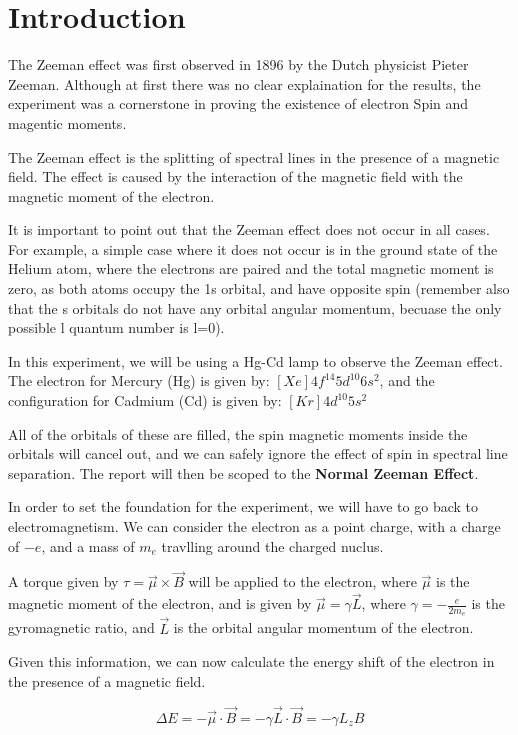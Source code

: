 \section{Introduction}

The Zeeman effect was first observed in 1896 by the Dutch physicist Pieter Zeeman. Although at first there was no clear explaination
for the results, the experiment was a cornerstone in proving the existence of electron Spin and magentic moments.

The Zeeman effect is the splitting of spectral lines in the presence of a magnetic field. The effect is caused by the
interaction of the magnetic field with the magnetic moment of the electron.

It is important to point out that the Zeeman effect does not occur in all cases. For example, a simple case where it does not occur
is in the ground state of the Helium atom, where the electrons are paired and the total magnetic moment is zero, as both atoms occupy the 1s orbital,
and have opposite spin (remember also that the s orbitals do not have any orbital angular momentum, becuase the only possible l
quantum number is l=0).

In this experiment, we will be using a Hg-Cd lamp to observe the Zeeman effect. The electron for Mercury (Hg) is given by: $[Xe] 4f^{14} 5d^{10} 6s^2$, and the
configuration for Cadmium (Cd) is given by: $[Kr] 4d^{10} 5s^2$

All of the orbitals of these are filled, the spin magnetic moments inside the orbitals will cancel out,
and we can safely ignore the effect of spin in spectral line separation. The report will then be scoped to the
\textbf{Normal Zeeman Effect}.

In order to set the foundation for the experiment, we will have to go back to electromagnetism.
We can consider the electron as a point charge, with a charge of $-e$, and a mass of $m_e$ travlling around the
charged nuclus.

A torque given by $\tau = \vec{\mu} \times \vec{B}$ will be applied to the electron, where $\vec{\mu}$ is the
magnetic moment of the electron,
and is given by $\vec{\mu} = \gamma \vec{L}$, where $\gamma = - \frac{e}{2 m_e}$ is the gyromagnetic ratio,
and $\vec{L}$ is the orbital angular momentum of the electron.

Given this information, we can now calculate the energy shift of the electron in the presence of a magnetic field.

\begin{equation}
    \Delta E = - \vec{\mu} \cdot \vec{B} = - \gamma \vec{L} \cdot \vec{B} = - \gamma L_z B
\end{equation}

